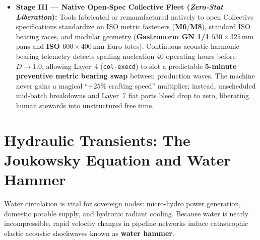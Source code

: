 \begin{itemize}
    \item \textbf{Stage III --- Native Open-Spec Collective Fleet (\textit{Zero-Stat Liberation}):} Tools fabricated or remanufactured natively to open Collective specifications standardize on ISO metric fasteners (\textbf{M6}/\textbf{M8}), standard ISO bearing races, and modular geometry (\textbf{Gastronorm GN 1/1} $530 \times 325\,\mathrm{mm}$ pans and \textbf{ISO $600 \times 400\,\mathrm{mm}$} Euro-totes). Continuous acoustic-harmonic bearing telemetry detects spalling nucleation 40 operating hours before $D \to 1.0$, allowing Layer~4 (\texttt{col-execd}) to slot a predictable \textbf{5-minute preventive metric bearing swap} between production waves. The machine never gains a magical ``$+25\%$ crafting speed'' multiplier; instead, unscheduled mid-batch breakdowns and Layer~7 fiat parts bleed drop to zero, liberating human stewards into unstructured free time.
\end{itemize}

\section{Hydraulic Transients: The Joukowsky Equation and Water Hammer}
\label{sec:mech_hammer}

Water circulation is vital for sovereign nodes: micro-hydro power generation, domestic potable supply, and hydronic radiant cooling. Because water is nearly incompressible, rapid velocity changes in pipeline networks induce catastrophic elastic acoustic shockwaves known as \textbf{water hammer}.

